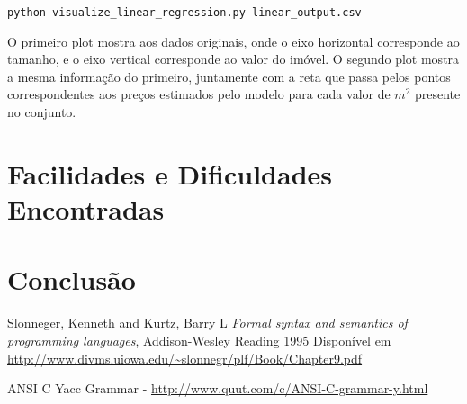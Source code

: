 \documentclass[12pt]{article}
\begin{document}
\begin{verbatim}
python visualize_linear_regression.py linear_output.csv
\end{verbatim}

O primeiro plot mostra aos dados originais, onde o eixo horizontal corresponde ao tamanho, e o eixo vertical corresponde ao valor do imóvel. O segundo plot mostra a mesma informação do primeiro, juntamente com a reta que passa pelos pontos correspondentes aos preços estimados pelo modelo para cada valor de $m^2$ presente no conjunto.

\section{Facilidades e Dificuldades Encontradas}

\section{Conclusão}

\begin{thebibliography}{9}
  Slonneger, Kenneth and Kurtz, Barry L
  \textit{Formal syntax and semantics of programming languages},
  Addison-Wesley Reading
  1995
  Disponível em \url{http://www.divms.uiowa.edu/~slonnegr/plf/Book/Chapter9.pdf}

\item ANSI C Yacc Grammar - \url{http://www.quut.com/c/ANSI-C-grammar-y.html}
\end{thebibliography}
	
\end{document}
